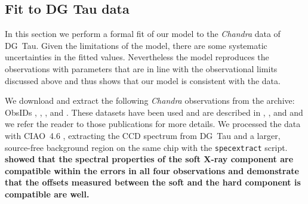 \subsection{Fit to DG Tau data}
In this section we perform a formal fit of our model to the \emph{Chandra} data of DG~Tau. 
Given the limitations of the model, there are some systematic uncertainties in the fitted values. Nevertheless the model reproduces the observations with parameters that are in line with the observational limits discussed above and thus shows that our model is consistent with the data.

We download and extract the following \emph{Chandra} observations from the archive: ObsIDs , , , and . These datasets have been used and are described in \citet{2008A&A...478..797G}, \citet{2008A&A...488L..13S}, and \citet{2009A&A...493..579G} and we refer the reader to those publications for more details. We processed the data with CIAO~4.6 \citep{2006SPIE.6270E..60F}, extracting the CCD spectrum from DG~Tau and a larger, source-free background region on the same chip with the \texttt{specextract} script.  \textbf{\citet{2008A&A...478..797G} showed that the spectral properties of the soft X-ray component are compatible within the errors in all four observations and \citet{2008A&A...488L..13S} demonstrate that the offsets measured between the soft and the hard component is compatible are well.} 
